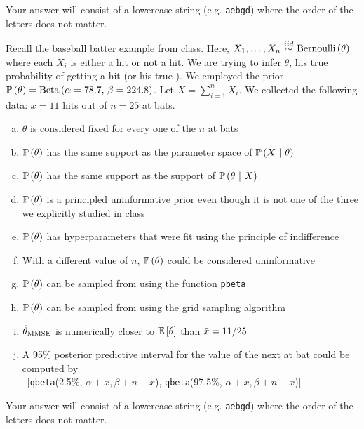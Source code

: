 \documentclass[12pt,landscape]{article}
\newcommand{\instr}{\small Your answer will consist of a lowercase string (e.g. \texttt{aebgd}) where the order of the letters does not matter. \normalsize}
\begin{document}
\eenum\instr\pagebreak



\problem{} Recall the baseball batter example from class. Here, $\Xoneton \iid \bernoulli{\theta}$ where each $X_i$ is either a hit or not a hit. We are trying to infer $\theta$, his true probability of getting a hit (or his true ). We employed the prior $\mathbb{P}\left(\theta\right) = \mathrm{Beta}\left(\alpha = 78.7,\,\beta = 224.8\right)$. Let $X = \sum_{i=1}^n X_i$. We collected the following data: $x = 11$ hits out of $n = 25$ at bats.

\vspace{-0.2cm}\benum{} 

\begin{enumerate}[(a)]
\item $\theta$ is considered fixed for every one of the $n$ at bats
\item $\mathbb{P}\left(\theta\right)$ has the same support as the parameter space of $\mathbb{P}\left(X~|~\theta\right)$
\item $\mathbb{P}\left(\theta\right)$ has the same support as the support of $\mathbb{P}\left(\theta~|~X\right)$
\item $\mathbb{P}\left(\theta\right)$ is a principled uninformative prior even though it is not one of the three we explicitly studied in class
\item $\mathbb{P}\left(\theta\right)$ has hyperparameters that were fit using the principle of indifference
\item With a different value of $n$, $\mathbb{P}\left(\theta\right)$ could be considered uninformative
\item $\mathbb{P}\left(\theta\right)$ can be sampled from using the function \texttt{pbeta}
\item $\mathbb{P}\left(\theta\right)$ can be sampled from using the grid sampling algorithm
\item $\hat{\theta}_{\mathrm{MMSE}}$ is numerically closer to $\mathbb{E}\left[\theta\right]$ than $\bar{x} = 11/25$ 
\item A 95\% posterior predictive interval for the value of the next at bat could be computed by\\ ~[\texttt{qbeta}(2.5\%, $\alpha + x, \beta + n - x$), \texttt{qbeta}(97.5\%, $\alpha + x, \beta + n - x$)]
\end{enumerate}
\eenum\instr\pagebreak

\end{document}
